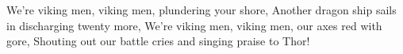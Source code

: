     \beginchorus\replay[chorus]
        We're viking men, viking men, plundering your shore,
        Another dragon ship sails in discharging twenty more, We're viking men,
        viking men, our axes red with gore,
        Shouting out our battle cries and singing praise to Thor!
    \endchorus
\endsong
